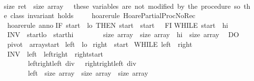 \begin{isabellebody}
{\isasymlbrace}\ \isanewline
{\isacharparenleft}size\ {\isasymacute}ret\ {\isacharequal}\ size\ \isactrlbsup {\isasymsigma}\isactrlesup array{\isacharparenright}\ \ {\isacharparenleft}{\isacharasterisk}\ these\ variables\ are\ not\ modified\ by\ the\ procedure{\isacharcomma}\ so\ the\ class\ invariant\ holds\ {\isacharasterisk}{\isacharparenright}\isanewline
{\isasymrbrace}\isanewline
{\isachardoublequoteclose}\isanewline
%
\isadelimproof
\ \ %
\endisadelimproof
%
\isatagproof
{}\isamarkupfalse%
\ {\isacharparenleft}hoare{\isacharunderscore}rule\ HoarePartial{\isachardot}ProcNoRec{}{\isacharparenright}\isanewline
\ \ \isamarkupfalse%
\ {\isacharparenleft}hoare{\isacharunderscore}rule\ anno{\isacharequal}{\isachardoublequoteopen}\isanewline
IF\ {\isasymacute}start\ {\isacharequal}\ {\isasymacute}lo\ THEN\ {\isasymacute}start\ {\isacharcolon}{\isacharequal}{\isacharequal}\ {\isasymacute}start\ {\isacharplus}\ {}\ FI{\isacharsemicolon}{\isacharsemicolon}\isanewline
WHILE\ {\isasymacute}start\ {\isacharless}\ {\isasymacute}hi\ \isanewline
\ INV\ {\isasymlbrace}\ {\isasymacute}start{\isasymge}{\isasymacute}lo\ {\isasymand}\ {\isasymacute}start{\isasymle}{\isasymacute}hi\ {\isasymand}\isanewline
\ \ \ \ \ \ \ size\ {\isasymacute}array\ {\isacharequal}\ size\ \isactrlbsup {\isasymsigma}\isactrlesup array\ {\isasymand}\ {\isasymacute}hi\ {\isasymle}\ size\ {\isasymacute}array\ {\isasymrbrace}\isanewline
\ DO\isanewline
\ {\isasymacute}pivot\ {\isacharcolon}{\isacharequal}{\isacharequal}\ {\isasymacute}array{\isacharbang}{\isasymacute}start{\isacharsemicolon}{\isacharsemicolon}\isanewline
\ {\isasymacute}left\ {\isacharcolon}{\isacharequal}{\isacharequal}\ {\isasymacute}lo{\isacharsemicolon}{\isacharsemicolon}\isanewline
\ {\isasymacute}right\ {\isacharcolon}{\isacharequal}{\isacharequal}\ {\isasymacute}start{\isacharsemicolon}{\isacharsemicolon}\isanewline
\ WHILE\ {\isasymacute}left\ {\isacharless}\ {\isasymacute}right\isanewline
\ INV\ {\isasymlbrace}\ {\isasymacute}left{\isasymge}{}\ {\isasymand}\ {\isasymacute}left{\isasymle}{\isasymacute}right\ {\isasymand}\ {\isasymacute}right{\isasymle}{\isasymacute}start\ {\isasymand}\ \isanewline
\ \ \ \ \ \ \ {\isasymacute}left{\isasymle}{\isacharparenleft}{\isasymacute}right{\isacharplus}{\isasymacute}left{\isacharparenright}\ div\ {}\ {\isasymand}\ {\isasymacute}right{\isasymge}{\isacharparenleft}{\isasymacute}right{\isacharplus}{\isasymacute}left{\isacharparenright}\ div\ {}\ {\isasymand}\isanewline
\ \ \ \ \ \ \ {\isasymacute}left\ {\isasymle}\ size\ {\isasymacute}array\ {\isasymand}\ size\ {\isasymacute}array\ {\isacharequal}\ size\ \isactrlbsup {\isasymsigma}\isactrlesup array\ {\isasymand}\isanewline

\end{isabellebody}
